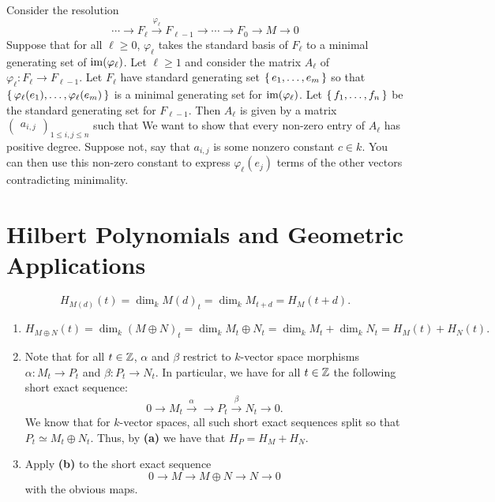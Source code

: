 \documentclass[letterpaper, 11pt, oneside]{book}
\begin{document}
\begin{sol}\label{ex:UAG_6.3.10}
  Consider the resolution
  \[
    \cdots \xrightarrow{} F_{\ell} \xrightarrow{\varphi_{\ell}} F_{\ell - 1} \xrightarrow{} \cdots \xrightarrow{} F_{0} \xrightarrow{} M \xrightarrow{} 0
  \]
  Suppose that for all $\ell \geq 0$, $\varphi_{\ell}$ takes the standard basis of $F_{\ell}$ to a minimal generating set of $\operatorname{im}(\varphi_{\ell})$.
  Let $\ell \geq 1$ and consider the matrix $A_{\ell}$ of $\varphi_{\ell}\colon F_{\ell} \to F_{\ell - 1}$.
  Let $F_{\ell}$ have standard generating set $\set{e_{1}, \ldots, e_{m}}$ so that $\set{\varphi_{\ell}(e_{1}), \ldots, \varphi_{\ell}(e_{m})}$ is a minimal generating set for $\operatorname{im}(\varphi_{\ell})$.
  Let $\set{f_{1}, \ldots, f_{n}}$ be the standard generating set for $F_{\ell - 1}$.
  Then $A_{\ell}$ is given by a matrix $\begin{pmatrix} a_{i, j} \end{pmatrix}_{1 \leq i, j \leq n}$ such that
  We want to show that every non-zero entry of $A_{\ell}$ has positive degree.
  Suppose not, say that $a_{i, j}$ is some nonzero constant $c \in k$.
  You can then use this non-zero constant to express $\varphi_{\ell}(e_{j})$ terms of the other vectors contradicting minimality.
\end{sol}

\clearpage

\section{Hilbert Polynomials and Geometric Applications}

\begin{sol}\label{ex:UAG_6.4.1}
  \[
    H_{M(d)}(t) = \dim_{k} M(d)_{t} = \dim_{k} M_{t + d} = H_{M}(t + d).
  \]
\end{sol}

\begin{sol}\label{ex:UAG_6.4.2}
  \begin{enumerate}
    \item
          \[
            H_{M \oplus N}(t) = \dim_{k} (M \oplus N)_{t} = \dim_{k} M_{t} \oplus N_{t} = \dim_{k} M_{t} + \dim_{k} N_{t} = H_{M}(t) + H_{N}(t).
          \]
    \item
          Note that for all $t \in \mathbb{Z}$, $\alpha$ and $\beta$ restrict to $k$-vector space morphisms $\alpha\colon M_{t} \to P_{t}$ and $\beta\colon P_{t} \to N_{t}$.
          In particular, we have for all $t \in \mathbb{Z}$ the following short exact sequence:
          \[
            0 \to M_{t} \xrightarrow{\alpha} \to P_{t} \xrightarrow{\beta} N_{t} \to 0.
          \]
          We know that for $k$-vector spaces, all such short exact sequences split so that $P_{t} \simeq M_{t} \oplus N_{t}$.
          Thus, by \textbf{(a)} we have that $H_{P} = H_{M} + H_{N}$.
    \item
          Apply \textbf{(b)} to the short exact sequence
          \[
            0 \to M \to M \oplus N \to N \to 0
          \]
          with the obvious maps.
  \end{enumerate}
\end{sol}
\end{document}
